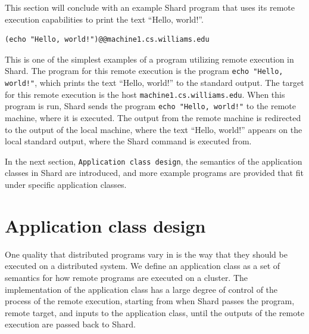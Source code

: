 \documentclass[twoside]{report}
\begin{document}
This section will conclude with an example Shard program that uses its remote execution capabilities to print the text ``Hello, world!''.

\begin{minipage}[c]{\textwidth-15pt}
  \begin{lstlisting}[language=Shard]
(echo "Hello, world!")@@machine1.cs.williams.edu
\end{lstlisting}
  \smallskip
\end{minipage}

This is one of the simplest examples of a program utilizing remote execution in Shard.
The program for this remote execution is the program \texttt{echo "Hello, world!"}, which prints the text ``Hello, world!'' to the standard output.
The target for this remote execution is the host \texttt{machine1.cs.williams.edu}.
When this program is run, Shard sends the program \texttt{echo "Hello, world!"} to the remote machine, where it is executed.
The output from the remote machine is redirected to the output of the local machine, where the text ``Hello, world!'' appears on the local standard output, where the Shard command is executed from.

In the next section, \texttt{Application class design}, the semantics of the application classes in Shard are introduced, and more example programs are provided that fit under specific application classes.

\section{Application class design}


One quality that distributed programs vary in is the way that they should be executed on a distributed system.
We define an application class as a set of semantics for how remote programs are executed on a cluster.
The implementation of the application class has a large degree of control of the process of the remote execution, starting from when Shard passes the program, remote target, and inputs to the application class, until the outputs of the remote execution are passed back to Shard.
\end{document}

